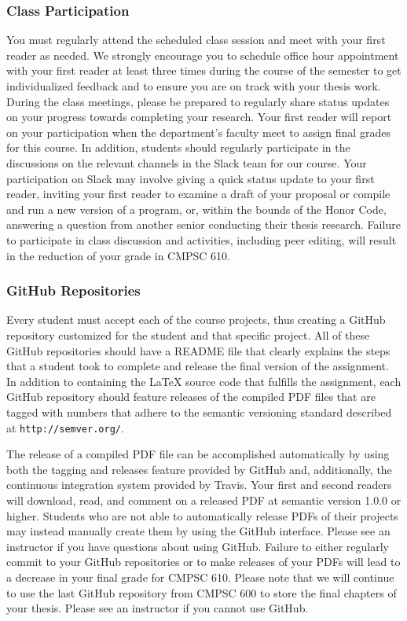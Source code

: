 \documentclass[11pt]{article}
\newcommand{\url}[1]{\lstinline{#1}}
\begin{document}
\subsubsection*{Class Participation}

You must regularly attend the scheduled class session and meet with your first
reader as needed. We strongly encourage you to schedule office hour
appointment with your first reader at least three times during the course
of the semester to get individualized feedback and to ensure you are
on track with your thesis work. During the class meetings, please be prepared to regularly share status updates on your progress towards completing your research. Your first reader will report on your participation when the department's faculty meet to assign final grades for this course. In addition, students should regularly participate in the discussions on the relevant channels in the Slack team for our course. Your participation on Slack may involve giving a quick status update to your first reader, inviting your first reader to examine a draft of your proposal or compile and run a new version of a program, or, within the bounds of the Honor Code, answering a question from another senior conducting their thesis research. Failure to participate in class discussion and activities, including peer editing, will result in the reduction of your grade in CMPSC 610.

\subsubsection*{GitHub Repositories}

Every student must accept each of the course projects, thus creating a GitHub
repository customized for the student and that specific project. All of these
GitHub repositories should have a README file that clearly explains the steps
that a student took to complete and release the final version of the
assignment. In addition to containing the \LaTeX{} source code that fulfills
the assignment, each GitHub repository should feature releases of the compiled
PDF files that are tagged with numbers that adhere to the semantic versioning
standard described at \url{http://semver.org/}.

The release of a compiled PDF file can be accomplished automatically by using
both the tagging and releases feature provided by GitHub and, additionally, the
continuous integration system provided by Travis. Your first and second readers
will download, read, and comment on a released PDF at semantic version 1.0.0 or
higher. Students who are not able to automatically release PDFs of their
projects may instead manually create them by using the GitHub interface. Please
see an instructor if you have questions about using GitHub. Failure to either
regularly commit to your GitHub repositories or to make releases of your PDFs
will lead to a decrease in your final grade for CMPSC 610. Please note that we
will continue to use the last GitHub repository from CMPSC 600 to store the
final chapters of your thesis. Please see an instructor if you cannot use
GitHub.
\end{document}
